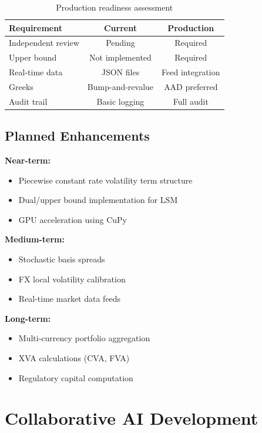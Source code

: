 \documentclass[10pt,a4paper]{article}
\begin{document}
\begin{table}[H]
\centering
\begin{tabular}{lcc}
\toprule
\textbf{Requirement} & \textbf{Current} & \textbf{Production} \\
\midrule
Independent review & Pending & Required \\
Upper bound & Not implemented & Required \\
Real-time data & JSON files & Feed integration \\
Greeks & Bump-and-revalue & AAD preferred \\
Audit trail & Basic logging & Full audit \\
\bottomrule
\end{tabular}
\caption{Production readiness assessment}
\end{table}

\subsection{Planned Enhancements}

\textbf{Near-term:}
\begin{itemize}
    \item Piecewise constant rate volatility term structure
    \item Dual/upper bound implementation for LSM
    \item GPU acceleration using CuPy
\end{itemize}

\textbf{Medium-term:}
\begin{itemize}
    \item Stochastic basis spreads
    \item FX local volatility calibration
    \item Real-time market data feeds
\end{itemize}

\textbf{Long-term:}
\begin{itemize}
    \item Multi-currency portfolio aggregation
    \item XVA calculations (CVA, FVA)
    \item Regulatory capital computation
\end{itemize}

\newpage

\section{Collaborative AI Development}
\end{document}
